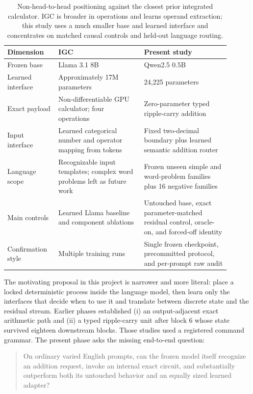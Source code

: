 \documentclass[11pt]{article}
\begin{document}
\begin{table}[H]
\centering
\scriptsize
\begin{tabular}{p{0.20\linewidth}p{0.35\linewidth}p{0.35\linewidth}}
\toprule
Dimension & IGC \cite{dietz2025} & Present study\\
\midrule
Frozen base & Llama 3.1 8B & Qwen2.5 0.5B\\
Learned interface & Approximately 17M parameters & 24,225 parameters\\
Exact payload & Non-differentiable GPU calculator; four operations &
Zero-parameter typed ripple-carry addition\\
Input interface & Learned categorical number and operator mapping from tokens &
Fixed two-decimal boundary plus learned semantic addition router\\
Language scope & Recognizable input templates; complex word problems left as
future work & Frozen unseen simple and word-problem families plus 16 negative
families\\
Main controls & Learned Llama baseline and component ablations &
Untouched base, exact parameter-matched residual control, oracle-on, and
forced-off identity\\
Confirmation style & Multiple training runs & Single frozen checkpoint,
precommitted protocol, and per-prompt raw audit\\
\bottomrule
\end{tabular}
\caption{Non-head-to-head positioning against the closest prior integrated
calculator. IGC is broader in operations and learns operand extraction; this
study uses a much smaller base and learned interface and concentrates on
matched causal controls and held-out language routing.}
\label{tab:igc-comparison}
\end{table}

The motivating proposal in this project is narrower and more literal: place a
locked deterministic process inside the language model, then learn only the
interfaces that decide when to use it and translate between discrete state and
the residual stream. Earlier phases established (i) an output-adjacent exact
arithmetic path and (ii) a typed ripple-carry unit after block 6 whose state
survived eighteen downstream blocks. Those studies used a registered command
grammar. The present phase asks the missing end-to-end question:

\begin{quote}
On ordinary varied English prompts, can the frozen model itself recognize an
addition request, invoke an internal exact circuit, and substantially
outperform both its untouched behavior and an equally sized learned adapter?
\end{quote}
\end{document}
